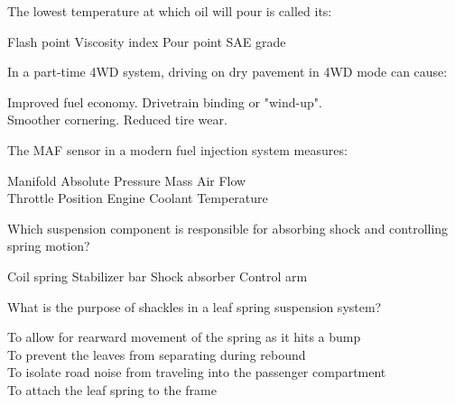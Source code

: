 \documentclass[12pt]{exam}
\begin{document}
\begin{questions}
                
                \question The lowest temperature at which oil will pour is called its: \\ %
                \begin{oneparchoices}
                    \choice Flash point
                    \choice Viscosity index
                    \choice Pour point  %
                    \choice SAE grade
                \end{oneparchoices}
                \question In a part-time 4WD system, driving on dry pavement in 4WD mode can cause: \\ %
				 \begin{oneparchoices} 
					\choice Improved fuel economy.
					\choice Drivetrain binding or "wind-up". \\ %
					\choice Smoother cornering.
					\choice Reduced tire wear.
				\end{oneparchoices}
                
                \question The MAF sensor in a modern fuel injection system measures: \\ %
				\begin{oneparchoices} 
					\choice Manifold Absolute Pressure
					\choice Mass Air Flow \\ %
					\choice Throttle Position
					\choice Engine Coolant Temperature
				\end{oneparchoices}

                
			    \question Which suspension component is responsible for absorbing shock and controlling spring motion? \\
                \begin{oneparchoices}
                    \choice Coil spring
                    \choice Stabilizer bar
                    \choice Shock absorber %
                    \choice Control arm
                \end{oneparchoices}
				\question What is the purpose of shackles in a leaf spring suspension system? \\
				\begin{oneparchoices} 
					\choice To allow for rearward movement of the spring as it hits a bump \\ 
					\choice To prevent the leaves from separating during rebound \\
					\choice To isolate road noise from traveling into the passenger compartment \\
					\choice To attach the leaf spring to the frame
				 \end{oneparchoices}
			 

\end{questions}
\end{document}
